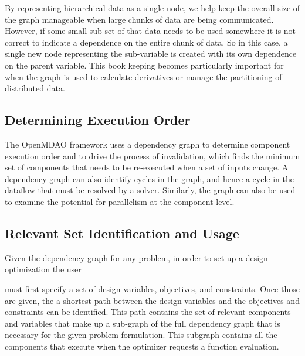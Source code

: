 \documentclass[]{aiaa-tc} %
\begin{document}
    By representing hierarchical data as a single node, we help keep the overall size of the graph manageable 
    when large chunks of data are being communicated. However, if some small sub-set of that data needs to be 
    used somewhere it is not correct to indicate a dependence on the entire chunk of data. So in this case, a 
    single new node representing the sub-variable is created with its own dependence on the parent variable. 
    This book keeping becomes particularly important for when the graph is used to calculate derivatives or 
    manage the partitioning of distributed data. 


    \subsection{Determining Execution Order}

    The OpenMDAO framework uses a dependency graph to determine component execution order and to
    drive the process of invalidation, which finds the minimum set of components that needs to
    be re-executed when a set of inputs change\cite{openmdao_derivatives}. A dependency graph
    can also identify cycles in the graph, and hence a cycle in the dataflow that must be resolved
    by a solver. Similarly, the graph can also be used to examine the potential for parallelism at
    the component level.

    \subsection{Relevant Set Identification and Usage}
    Given the dependency graph for any problem, in order to set up a design optimization the user

    must first specify a set of design variables, objectives, and constraints. Once those are given,
    the a shortest path between the design variables and the objectives and constraints can be identified.
    This path contains the set of relevant components and variables that make up a sub-graph of the full
    dependency graph that is necessary for the given problem formulation. This subgraph
    contains all the components that execute when the optimizer requests a function evaluation.
\end{document}

